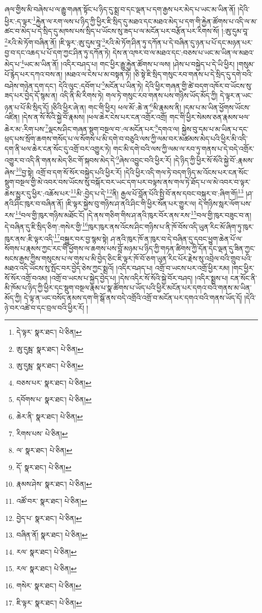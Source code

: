 ཞལ་གྱིས་མི་བཞེས་པ་ལ་རྒྱུ་གཞན་སྟོང་པ་ཉིད་དུ་སྨྲ་བ་དང་ལྡན་པ་དག་རྒྱས་པར་མེད་པ་ཡང་མ་ཡིན་ནོ། །དེའི་ཕྱིར་:ད་ལྟར་\footnote{དེ་ལྟར་  སྣར་ཐང་།  པེ་ཅིན། }རྐྱེན་ལ་རག་ལས་པ་ཉིད་ཀྱི་ཕྱིར་ཇི་སྲིད་དུ་མཐའ་དང་མཐའ་མེད་པ་དག་གི་རྐྱེན་ཚོགས་པ་འདི་ལ་མ་ཚང་བ་མེད་པ་དེ་སྲིད་དུ་མཁས་པས་སྲིད་པ་ཡོངས་སུ་ཟད་པ་ལ་མངོན་པར་བརྩོན་པར་རིགས་སོ། །:ཨུ་དུམ་བཱ་\footnote{ཨུ་དུམྦ་  སྣར་ཐང་།  པེ་ཅིན། }རའི་མེ་ཏོག་བཞིན་ནོ། །ཇི་ལྟར་:ཨུ་དུམ་བཱ་\footnote{ཨུ་དུམྦ་  སྣར་ཐང་།  པེ་ཅིན། }རའི་མེ་ཏོག་ཤིན་ཏུ་དཀོན་པ་དེ་བཞིན་དུ་ཉན་པ་པོ་དང་མཉན་པར་བྱ་བ་དང་འཆད་པ་པོ་དག་ཀྱང་ཤིན་ཏུ་དཀོན་ཏེ། དེས་ན་འཁར་བ་ལ་མཐའ་དང་:བཅས་པ་ཡང་མ་ཡིན་ལ་མཐའ་མེད་པ་\footnote{བཅས་པར་  སྣར་ཐང་།  པེ་ཅིན། }ཡང་མ་ཡིན་ནོ། །འདིར་བཤད་པ། གང་ཕྱིར་རྒྱུ་རྐྱེན་ཚོགས་པ་ལས། །ཤེས་པ་བསྐྱེད་པ་དེ་ཡི་ཕྱིར། །གསུམ་པོ་རྙེད་པར་དཀའ་བས་ན། །མཐའ་ལ་ངེས་པ་མ་བསྟན་ཏོ། །ཅི་སྟེ་ཇི་སྲིད་གསུང་རབ་གནས་པ་དེ་སྲིད་དུ་དགེ་བའི་བཤེས་གཉེན་དག་དང་། དེའི་ལུང་:དབོག་པ་\footnote{དབོགས་པ་  སྣར་ཐང་།  པེ་ཅིན། }མངོན་པ་ཡིན་ཏེ། དེའི་ཕྱིར་གཞན་གྱི་ཚེ་བདག་འཁོར་བ་ཡོངས་སུ་ཟད་པར་བྱེད་དོ་སྙམ་ན། འདི་ནི་མི་རིགས་ཏེ། གལ་ཏེ་གསུང་རབ་གནས་པས་གཉིས་ཡོད་མོད་ཀྱི། དེ་ལྟར་ན་ཡང་ཉན་པ་པོ་མི་སྲིད་དོ། །ཅིའི་ཕྱིར་ཞེ་ན། གང་གི་ཕྱིར། ཕལ་མོ་:ཆེ་ན་\footnote{ཆེར་ནི་  སྣར་ཐང་།  པེ་ཅིན། }མི་རྣམས་ནི། །དམ་པ་མ་ཡིན་ཕྱོགས་ཡོངས་འཛིན། །དེས་ན་སོ་སོའི་སྐྱེ་བོ་རྣམས། །ཕལ་ཆེར་ངེས་པར་ངན་འགྲོར་འགྲོ། གང་གི་ཕྱིར་སེམས་ཅན་རྣམས་ཕལ་ཆེར་མ་:རིག་པས་\footnote{རིགས་པས་  པེ་ཅིན། }ལྡངས་ཤིང་གཞན་སྡུག་བསྔལ་བ་:ལ་མངོན་པར་\footnote{ལ་  སྣར་ཐང་།  པེ་ཅིན། }དགའ་ལ། སྐྱེས་བུ་དམ་པ་མ་ཡིན་པ་དང་ཕྲད་པས་སྲོག་ཆགས་གསོད་པ་ལ་སོགས་པ་མི་དགེ་བ་བཅུའི་ལས་ཀྱི་ལམ་བར་མཚམས་མེད་པའི་ཕྱིར་མི་འདི་དག་ནི་ཕལ་ཆེར་ངན་སོང་དུ་འགྲོ་བར་འགྱུར་ཏེ། གང་མི་དགེ་བའི་ལས་ཀྱི་ལམ་ལ་རབ་ཏུ་གནས་པ་དེ་བདེ་འགྲོར་འགྱུར་བ་འདི་ནི་གནས་མེད་ཅིང་གོ་སྐབས་མེད་དེ་\footnote{དོ་  སྣར་ཐང་།  པེ་ཅིན། }ཞེས་འབྱུང་བའི་ཕྱིར་རོ། །དེ་ཉིད་ཀྱི་ཕྱིར་སོ་སོའི་སྐྱེ་བོ་:རྣམས་ཞེས་\footnote{རྣམས་ཤེས་  སྣར་ཐང་།  པེ་ཅིན། }བྱ་སྟེ། འགྲོ་བ་དག་སོ་སོར་བསྐྱེད་པའི་ཕྱིར་རོ། །དེའི་ཕྱིར་འདི་གལ་ཏེ་བདག་ཉིད་མ་འོངས་པར་ངན་སོང་སྡུག་བསྔལ་གྱི་མེ་འབར་བས་ཡོངས་སུ་བསྐོར་བར་ཡང་དག་པར་བལྟས་ནས་གལ་ཏེ་ཐོད་པ་ལ་མེ་འབར་བ་ལྟར་ཆེས་མྱུར་དུ་ཕྱིར་:འཆོས་པར་\footnote{འཚོ་བར་  སྣར་ཐང་།  པེ་ཅིན། }མི་:བྱེད་པ་དེ་\footnote{བྱེད་པ་  སྣར་ཐང་།  པེ་ཅིན། }ནི། རྒྱལ་པོ་བློན་པོའི་སྤྱི་བོ་ནས་དབང་བསྐུར་བ་:ཞིག་གོ།\footnote{བཞིན་ནོ།  སྣར་ཐང་།  པེ་ཅིན། } །ཤ་ནའི་ཤིང་ཁུར་བ་བཞིན་ནོ། །ཇི་ལྟར་སྐྱེས་བུ་གཉིས་ཤ་ནའི་ཤིང་གི་ཕྱིར་སོན་པར་གྱུར་ལ། དེ་གཉིས་སླར་ལོག་པས་རས་\footnote{རལ་  སྣར་ཐང་།  པེ་ཅིན། }བལ་གྱི་ཁུར་གཉིས་མཐོང་ངོ། །དེ་ནས་གཅིག་གིས་ཤ་ནའི་ཁུར་བོར་ནས་རས་\footnote{རལ་  སྣར་ཐང་།  པེ་ཅིན། }བལ་གྱི་ཁུར་བཟུང་བ་ན། དེ་བཞིན་དུ་ཇི་སྲིད་ཅིག་:གསེར་གྱི་\footnote{གསེར་  སྣར་ཐང་།  པེ་ཅིན། }ཁུར་ཁུར་ནས་འོངས་ཤིང་གཉིས་པ་ནི་ཁོ་བོས་འདི་ཡུན་རིང་མོ་ཞིག་ཏུ་ཁུར་ཁུར་ནས་:ཇི་ལྟར་འདི་\footnote{ཇི་ལྟར་  སྣར་ཐང་།  པེ་ཅིན། }བསྐྱུར་བར་བྱ་སྙམ་སྟེ། ཤ་ནའི་ཁུར་ཁོ་ན་ཁུར་བ་དེ་བཞིན་དུ་དབང་ཕྱུག་ཆེན་པོ་ལ་སོགས་པ་རྣམས་ཀྱང་རང་གི་ཕྱོགས་ལ་ཆགས་པས་བློ་མཉམ་པ་ཉིད་ཀྱི་གཏན་ཚིགས་ཀྱི་དོན་དང་ལྡན་དུ་ཟིན་ཀྱང་སངས་རྒྱས་ཀྱིས་གསུངས་པ་ལ་གུས་པ་མི་བྱེད་ཅིང་ཇི་ལྟར་ཁོ་བོ་ཅག་ཡུན་རིང་པོར་རྗེས་སུ་འབྲེལ་བའི་གྲུབ་པའི་མཐའ་འདི་ཡོངས་སུ་སྤོང་བར་བྱེད་ཅེས་ཀྱང་སྨྲའོ། །འདིར་བཤད་པ། འགྲོ་བ་ཡངས་པར་འགྲོ་ཕྱིར་རམ། །གང་ཕྱིར་སོ་སོར་འགྲོ་བའམ། །འགྲོ་བ་ཡངས་པ་སྐྱེད་བྱེད་པ། །དེས་འདིར་སོ་སོའི་སྐྱེ་བོར་བཤད། །འདིར་སྨྲས་པ། ངན་སོང་ནི་མི་ཁོམ་པ་ཉིད་ཀྱི་ཕྱིར་དང་སྡུག་བསྔལ་རྣམ་པ་སྣ་ཚོགས་པ་ཡོད་པའི་ཕྱིར་མངོན་པར་དགའ་བའི་གནས་མ་ཡིན་མོད་ཀྱི། དེ་ལྟ་ན་ཡང་བསོད་ནམས་དག་གི་སྒོ་ནས་བདེ་འགྲོའི་འགྲོ་བ་མངོན་པར་དགའ་བའི་གནས་ཡོད་དོ། །དེའི་ཉེ་བར་འཚེ་བ་དང་བྲལ་བའི་ཕྱིར་རོ། །
